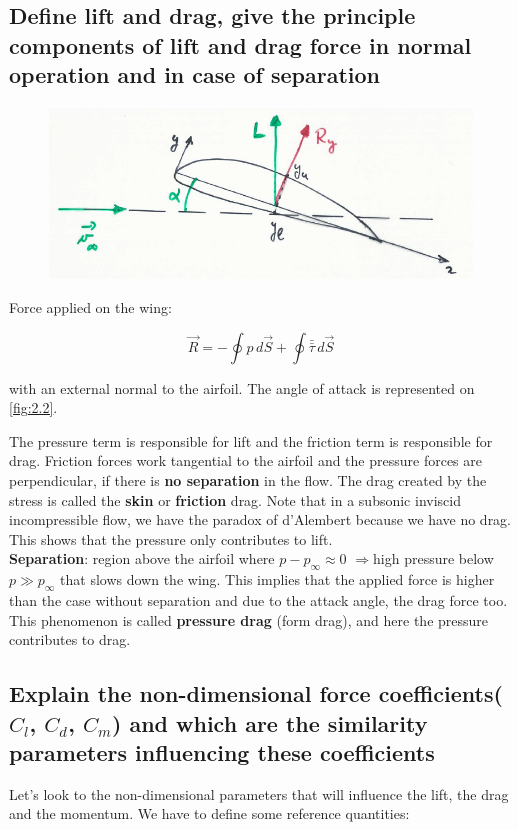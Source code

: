 \documentclass[british,french,11pt, a4paper, openany]{article}
\begin{document}
\subsection{Define lift and drag, give the principle components of lift and drag force in
	normal operation and in case of separation}
	
\begin{figure}
	\vspace{-5mm}
	\includegraphics[scale=0.25]{ch2/3}
	\label{fig:2.2}
\end{figure}
Force applied on the wing:

\begin{equation}
\vec{R} = -\oint p \, d\vec{S} + \oint \bar{\bar{\tau}} \, d\vec{S} 
\end{equation}

with an external normal to the airfoil. The angle of attack is represented on \autoref{fig:2.2}.

The pressure term is responsible for lift and the friction term is responsible for drag. Friction forces work tangential to the airfoil and the pressure forces are perpendicular, if there is \textbf{no separation} in the flow. The drag created by the stress is called the \textbf{skin} or \textbf{friction} drag. 
Note that in a subsonic inviscid incompressible flow, we have the paradox of d’Alembert because we have no drag. This shows that the pressure only contributes to lift. \\

\textbf{Separation}: region above the airfoil where $p-p_\infty \approx 0$ $\Rightarrow$high pressure below $p\gg p_\infty$ that slows down the wing. This implies that the applied force is higher than the case without separation and due to the attack angle, the drag force too. This phenomenon is called \textbf{pressure drag} (form drag), and here the pressure contributes to drag.


\subsection{Explain the non-dimensional force coefficients($C_l$, $C_d$, $C_m$) and which are the
	similarity parameters influencing these coefficients}
Let’s look to the non-dimensional parameters that will influence the lift, the drag and the momentum. We have to define some reference quantities: 
\end{document}

